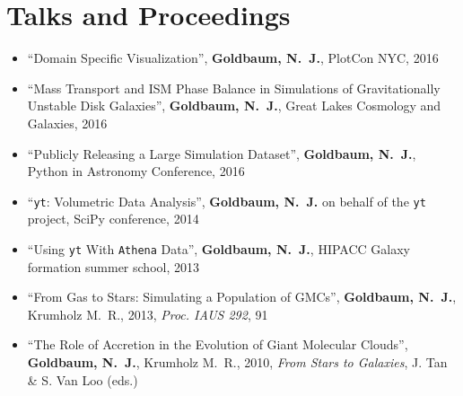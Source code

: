 \documentclass[10pt,letterpaper]{article}
\begin{document}
\section*{Talks and Proceedings}

\begin{itemize}

\item[] ``Domain Specific Visualization'', {\bf Goldbaum, N.~J.}, PlotCon NYC,
  2016
\item[] ``Mass Transport and ISM Phase Balance in Simulations of Gravitationally
  Unstable Disk Galaxies'', {\bf Goldbaum, N.~J.}, Great Lakes Cosmology and
  Galaxies, 2016
\item[] ``Publicly Releasing a Large Simulation Dataset'', {\bf Goldbaum,
    N.~J.}, Python in Astronomy Conference, 2016
\item[] ``\texttt{yt}: Volumetric Data Analysis'', {\bf Goldbaum, N.~J.} on
  behalf of the \texttt{yt} project, SciPy conference, 2014
\item[] ``Using \texttt{yt} With \texttt{Athena} Data'', {\bf Goldbaum, N.~J.},
  HIPACC Galaxy formation summer school, 2013
\item[] ``From Gas to Stars: Simulating a Population of GMCs'', {\bf Goldbaum,
    N.~J.}, Krumholz M.~R., 2013, \textit{Proc. IAUS 292}, 91
\item[] ``The Role of Accretion in the Evolution of Giant Molecular Clouds'',
  {\bf Goldbaum, N.~J.}, Krumholz M.~R., 2010, \textit{From Stars to Galaxies},
  J. Tan \& S. Van Loo (eds.)

\end{itemize}
\end{document}
